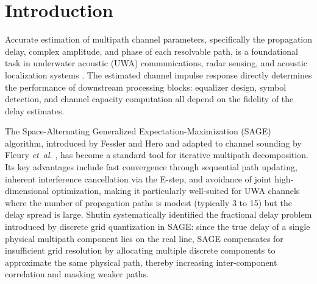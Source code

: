 \documentclass[a4paper,fleqn]{cas-dc}
\begin{document}
\hfuzz=1000pt
\overfullrule=0pt
\maketitle






\section{Introduction}
\label{sec:intro}

Accurate estimation of multipath channel parameters, specifically the propagation delay, complex amplitude, and phase of each resolvable path, is a foundational task in underwater acoustic (UWA) communications, radar sensing, and acoustic localization systems \cite{stojanovic2009,eggen2001}. The estimated channel impulse response directly determines the performance of downstream processing blocks: equalizer design, symbol detection, and channel capacity computation all depend on the fidelity of the delay estimates.

The Space-Alternating Generalized Expectation-Maximization (SAGE) algorithm, introduced by Fessler and Hero \cite{fessler1994} and adapted to channel sounding by Fleury \textit{et~al.} \cite{fleury1999}, has become a standard tool for iterative multipath decomposition. Its key advantages include fast convergence through sequential path updating, inherent interference cancellation via the E-step, and avoidance of joint high-dimensional optimization, making it particularly well-suited for UWA channels where the number of propagation paths is modest (typically 3 to 15) but the delay spread is large. Shutin \cite{shutin2004} systematically identified the fractional delay problem introduced by discrete grid quantization in SAGE: since the true delay of a single physical multipath component lies on the real line, SAGE compensates for insufficient grid resolution by allocating multiple discrete components to approximate the same physical path, thereby increasing inter-component correlation and masking weaker paths.
\end{document}
